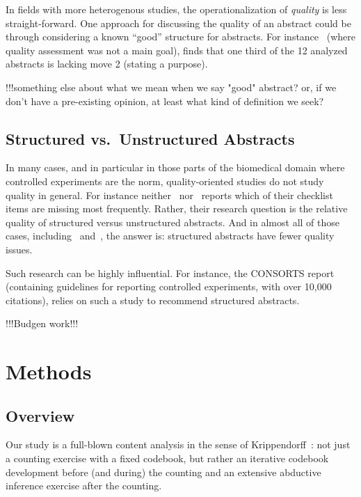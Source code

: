 \documentclass[10pt,journal,compsoc]{IEEEtran}
\begin{document}
In fields with more heterogenous studies, the operationalization of
\emph{quality} is less straight-forward.
One approach for discussing the quality of an abstract could be through considering
a known ``good'' structure for abstracts.
For instance~\cite{CroOpp06} (where quality assessment was not a main goal),
finds that one third of the 12 analyzed abstracts is lacking move 2 (stating a purpose).

!!!something else about what we mean when we say "good" abstract? or, if we don't have a pre-existing
opinion, at least what kind of definition we seek?

\subsection{Structured vs.\ Unstructured Abstracts}

In many cases, and in particular in those parts of the biomedical domain
where controlled experiments are the norm, quality-oriented studies do not study
quality in general.
For instance neither~\cite{DupKhoLeb03} nor~\cite{ShaHar06} reports
which of their checklist items are missing most frequently.
Rather, their research question is the relative quality of structured
versus unstructured abstracts.
And in almost all of those cases, including~\cite{DupKhoLeb03} and~\cite{ShaHar06},
the answer is: structured abstracts have fewer quality issues.

Such research can be highly influential.
For instance, the CONSORTS report~\cite{MohHopSch12}
(containing guidelines for reporting controlled experiments, with over 10,000 citations),
relies on such a study \cite{HarSydBlu96} to recommend structured abstracts.

!!!Budgen work!!!


\section{Methods}


\subsection{Overview}

Our study is a full-blown content analysis in the sense of Krippendorff~\cite{Krippendorff04}:
not just a counting exercise with a fixed codebook,
but rather an iterative codebook development before (and during) the counting
and an extensive abductive inference exercise after the counting.
\end{document}
